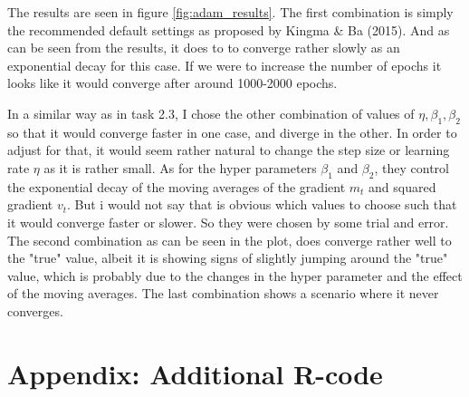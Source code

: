 \documentclass[11pt, a4paper, english]{article}\usepackage[]{graphicx}\usepackage[dvipsnames]{xcolor}
\begin{document}
The results are seen in figure \ref{fig:adam_results}. The first combination is simply the recommended default settings as proposed by Kingma \& Ba (2015). And as can be seen from the results, it does to to converge rather slowly as an exponential decay for this case. If we were to increase the number of epochs it looks like it would converge after around 1000-2000 epochs. 

In a similar way as in task 2.3, I chose the other combination of values of $\eta, \beta_1, \beta_2$ so that it would converge faster in one case, and diverge in the other. In order to adjust for that, it would seem rather natural to change the step size or learning rate $\eta$ as it is rather small. As for the hyper parameters $\beta_1$ and $\beta_2$, they control the exponential decay  of the moving averages of the gradient $m_t$ and squared gradient $v_t$. But i would not say that is obvious which values to choose such that it would converge faster or slower. So they were chosen by some trial and error. The second combination as can be seen in the plot, does converge rather well to the "true" value, albeit it is showing signs of slightly jumping around the "true" value, which is probably due to the changes in the hyper parameter and the effect of the moving averages. The last combination shows a scenario where it never converges. 

\section{Appendix: Additional R-code}
\end{document}
